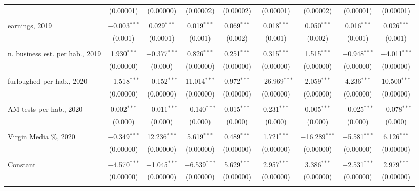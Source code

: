 \documentclass[]{interact}
\theoremstyle{plain}%
\theoremstyle{definition}
\theoremstyle{remark}
\begin{document}
\begin{table}
\begin{tabular}{@{\extracolsep{5pt}}lcccccccc}
  & (0.00001) & (0.00000) & (0.00002) & (0.00002) & (0.00001) & (0.00002) & (0.00001) & (0.00001) \\ 
  & & & & & & & & \\ 
 earnings, 2019 & $-$0.003$^{***}$ & 0.029$^{***}$ & 0.019$^{***}$ & 0.069$^{***}$ & 0.018$^{***}$ & 0.050$^{***}$ & 0.016$^{***}$ & 0.026$^{***}$ \\ 
  & (0.001) & (0.0001) & (0.001) & (0.002) & (0.001) & (0.002) & (0.001) & (0.001) \\ 
  & & & & & & & & \\ 
 n. business est. per hab., 2019 & 1.930$^{***}$ & $-$0.377$^{***}$ & 0.826$^{***}$ & 0.251$^{***}$ & 0.315$^{***}$ & 1.515$^{***}$ & $-$0.948$^{***}$ & $-$4.011$^{***}$ \\ 
  & (0.00000) & (0.000) & (0.00000) & (0.00000) & (0.00000) & (0.00000) & (0.00000) & (0.00000) \\ 
  & & & & & & & & \\ 
 furloughed per hab., 2020 & $-$1.518$^{***}$ & $-$0.152$^{***}$ & 11.014$^{***}$ & 0.972$^{***}$ & $-$26.969$^{***}$ & 2.059$^{***}$ & 4.236$^{***}$ & 10.500$^{***}$ \\ 
  & (0.00000) & (0.00000) & (0.00000) & (0.00000) & (0.00000) & (0.00000) & (0.00000) & (0.00000) \\ 
  & & & & & & & & \\ 
 AM tests per hab., 2020 & 0.002$^{***}$ & $-$0.011$^{***}$ & $-$0.140$^{***}$ & 0.015$^{***}$ & 0.231$^{***}$ & 0.005$^{***}$ & $-$0.025$^{***}$ & $-$0.078$^{***}$ \\ 
  & (0.000) & (0.000) & (0.000) & (0.000) & (0.000) & (0.000) & (0.000) & (0.000) \\ 
  & & & & & & & & \\ 
 Virgin Media \%, 2020 & $-$0.349$^{***}$ & 12.236$^{***}$ & 5.619$^{***}$ & 0.489$^{***}$ & 1.721$^{***}$ & $-$16.289$^{***}$ & $-$5.581$^{***}$ & 6.126$^{***}$ \\ 
  & (0.00000) & (0.00000) & (0.00000) & (0.00000) & (0.00000) & (0.00000) & (0.00000) & (0.00000) \\ 
  & & & & & & & & \\ 
 Constant & $-$4.570$^{***}$ & $-$1.045$^{***}$ & $-$6.539$^{***}$ & 5.629$^{***}$ & 2.957$^{***}$ & 3.386$^{***}$ & $-$2.531$^{***}$ & 2.979$^{***}$ \\ 
  & (0.00000) & (0.00000) & (0.00000) & (0.00000) & (0.00000) & (0.00000) & (0.00000) & (0.00000) \\ 
  & & & & & & & & \\ 

\end{tabular}
\end{table}
\end{document}
